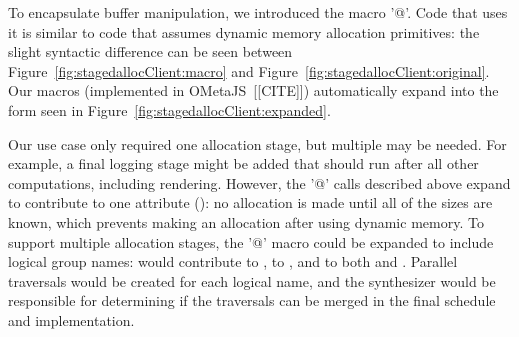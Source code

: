 To encapsulate buffer manipulation, we introduced the macro '@'.  Code that uses it is similar to code that assumes dynamic memory allocation primitives: the slight syntactic difference can be seen between Figure~\ref{fig:stagedallocClient:macro}  and Figure~\ref{fig:stagedallocClient:original}. Our macros (implemented in OMetaJS~[[CITE]]) automatically expand into the form seen in Figure~\ref{fig:stagedallocClient:expanded}. 

Our use case only required one allocation stage, but multiple may be needed.  For example, a final logging stage might be added that should run after all other computations, including rendering. However, the '@' calls described above expand to contribute to one attribute (): no allocation is made until all of the sizes are known, which prevents making an allocation after using dynamic memory. To support multiple allocation stages, the '@' macro could be expanded to include logical group names:  would contribute to ,  to , and  to both  and . Parallel traversals would be created for each logical name, and the synthesizer would be responsible for determining if the traversals can be merged in the final schedule and implementation.

